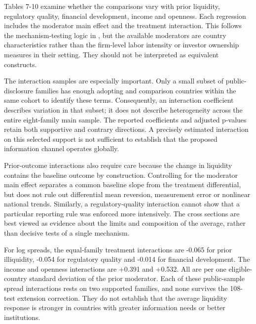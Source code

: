 \documentclass[12pt,letterpaper]{article}
\makeatletter
\renewcommand{\subsection}{\@startsection{subsection}{2}{\z@}{-3.25ex plus -1ex minus -.2ex}{1.5ex plus .2ex}{\normalfont\normalsize\bfseries}}
\makeatother
\begin{document}
\subsection{Country cross sections}

Tables 7-10 examine whether the comparisons vary with prior liquidity, regulatory quality, financial development, income and openness. Each regression includes the moderator main effect and the treatment interaction. This follows the mechanism-testing logic in \citet{dube2021}, but the available moderators are country characteristics rather than the firm-level labor intensity or investor ownership measures in their setting. They should not be interpreted as equivalent constructs.


The interaction samples are especially important. Only a small subset of public-disclosure families has enough adopting and comparison countries within the same cohort to identify these terms. Consequently, an interaction coefficient describes variation in that subset; it does not describe heterogeneity across the entire eight-family main sample. The reported coefficients and adjusted p-values retain both supportive and contrary directions. A precisely estimated interaction on this selected support is not sufficient to establish that the proposed information channel operates globally.


Prior-outcome interactions also require care because the change in liquidity contains the baseline outcome by construction. Controlling for the moderator main effect separates a common baseline slope from the treatment differential, but does not rule out differential mean reversion, measurement error or nonlinear national trends. Similarly, a regulatory-quality interaction cannot show that a particular reporting rule was enforced more intensively. The cross sections are best viewed as evidence about the limits and composition of the average, rather than decisive tests of a single mechanism.


For log spreads, the equal-family treatment interactions are -0.065 for prior illiquidity, -0.054 for regulatory quality and -0.014 for financial development. The income and openness interactions are +0.391 and +0.532. All are per one eligible-country standard deviation of the prior moderator. Each of these public-sample spread interactions rests on two supported families, and none survives the 108-test extension correction. They do not establish that the average liquidity response is stronger in countries with greater information needs or better institutions.
\end{document}

